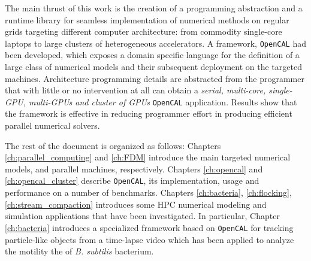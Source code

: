 The main thrust of this work is the creation of a programming abstraction and a runtime library for seamless implementation of numerical methods on regular grids targeting different computer architecture: from commodity single-core laptops to large clusters of heterogeneous accelerators. A framework, \texttt{OpenCAL} had been developed, which exposes a domain specific language for the definition of a large class of numerical models and their subsequent deployment on the targeted machines. Architecture programming details are abstracted from the programmer that with little or no intervention at all can obtain a \textit{serial, multi-core, single-GPU, multi-GPUs and cluster of GPUs} \texttt{OpenCAL} application. 
Results show that the framework is effective in reducing programmer effort in producing efficient parallel numerical solvers.

The rest of the document is organized as follows:
Chapters \ref{ch:parallel_computing} and  \ref{ch:FDM} introduce the main targeted numerical models, and parallel machines, respectively.
Chapters \ref{ch:opencal} and \ref{ch:opencal_cluster} describe \texttt{OpenCAL}, its implementation, usage and performance on a number of benchmarks.
Chapters \ref{ch:bacteria}, \ref{ch:flocking}, \ref{ch:stream_compaction} introduces some HPC numerical modeling and simulation applications that have been investigated.
In particular, Chapter \ref{ch:bacteria} introduces a specialized framework based on \texttt{OpenCAL} for tracking particle-like objects from a time-lapse video which has been applied to analyze the motility  the of \textit{B. subtilis} bacterium.